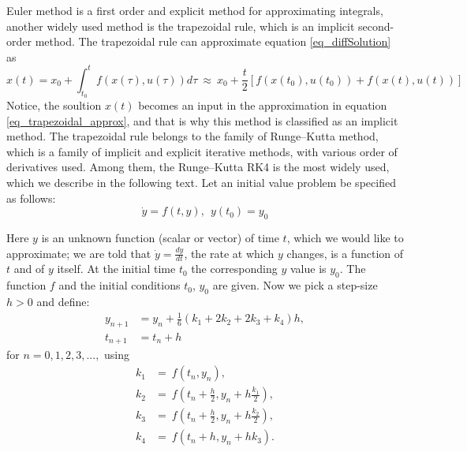 \documentclass  [
  paper    = a4,
  BCOR     = 10mm,
  twoside,
  fontsize = 12pt,
  fleqn,
  toc      = bibnumbered,
  toc      = listofnumbered,
  numbers  = noendperiod,
  headings = normal,
  listof   = leveldown,
  version  = 3.03
]                                       {scrreprt}
\newcommand{\<}{\langle}
\renewcommand{\>}{\rangle}
\begin{document}
  	Euler method is a first order and explicit method for approximating integrals, another widely used method is the trapezoidal rule, which is an implicit second-order method. The trapezoidal rule can approximate equation \ref{eq_diffSolution} as 
  	\begin{equation}
  		x(t)  = x_0  + \int_{t_0}^{t}  f(x(\tau), u(\tau)) d \tau \ \approx \   x_0  + \frac{t}{2}[f(x(t_0), u(t_0)) + f(x(t), u(t))]  
  		\label{eq_trapezoidal_approx}
  	\end{equation}
  	Notice, the soultion $x(t)$ becomes an input in the approximation in equation \ref{eq_trapezoidal_approx}, and that is why this method is classified as an implicit method. The trapezoidal rule belongs to the family of Runge–Kutta method, which is a family of implicit and explicit iterative methods, with various order of derivatives used. Among them, the Runge–Kutta  RK4 is the most widely used, which we describe in the following text. Let an initial value problem be specified as follows:
  	\begin{equation}\label{eqn:RK4_diff}
  		\dot{y} = f(t, y) , \ \  y(t_0) = y_0  
  	\end{equation}
  	
  	Here $y$ is an unknown function (scalar or vector) of time $t$, which we would like to approximate; we are told that $\dot{y} = \frac{dy}{dt}$, the rate at which $y$ changes, is a function of $t$ and of $y$ itself. At the initial time $t_0$ the corresponding $y$ value is $y_0$. The function $f$ and the initial conditions $t_0$, $y_0$ are given. Now we pick a step-size $h>0$ and define:
  	\begin{align}
  		y_{n+1} &= y_n + \frac{1}{6}\left(k_1 + 2k_2 + 2k_3 + k_4 \right)h,\\
  		t_{n+1} &= t_n + h
  	\end{align}
  	for $n = 0, 1, 2, 3, ...,$ using
  	\begin{align}
  		k_1 &= \ f(t_n, y_n), \\
  		k_2 &= \ f\!\left(t_n + \frac{h}{2}, y_n + h\frac{k_1}{2}\right), \\ 
  		k_3 &= \ f\!\left(t_n + \frac{h}{2}, y_n + h\frac{k_2}{2}\right), \\
  		k_4 &= \ f\!\left(t_n + h, y_n + hk_3\right).
  	\end{align}
  	
\end{document}
